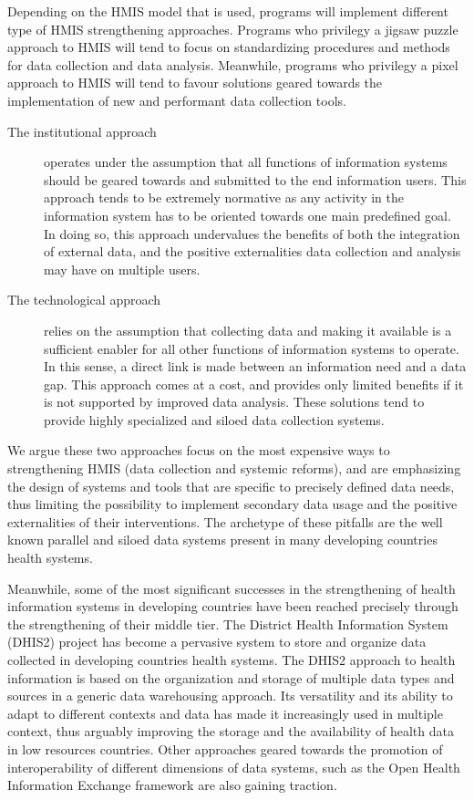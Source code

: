 Depending on the HMIS model that is used, programs will implement different type of HMIS strengthening approaches. Programs who privilegy a jigsaw puzzle approach to HMIS will tend to focus on standardizing procedures and methods for data collection and data analysis. Meanwhile, programs who privilegy a pixel approach to HMIS will tend to favour solutions geared towards the implementation of new and performant data collection tools.

\begin{description}
\item[The institutional approach] operates under the assumption that all functions of information systems should be geared towards and submitted to the end information users. This approach tends to be extremely normative as any activity in the information system has to be oriented towards one main predefined goal. In doing so, this approach undervalues the benefits of both the integration of external data, and the positive externalities data collection and analysis may have on multiple users.

\item[The technological approach] relies on the assumption that collecting data and making it available is a sufficient enabler for all other functions of information systems to operate. In this sense, a direct link is made between an information need and a data gap. This approach comes at a cost, and provides only limited benefits if it is not supported by improved data analysis. These solutions tend to provide highly specialized and siloed data collection systems.
\end{description}

We argue these two approaches focus on the most expensive ways to strengthening HMIS (data collection and systemic reforms), and are emphasizing the design of systems and tools that are specific to precisely defined data needs, thus limiting the possibility to implement secondary data usage and the positive externalities of their interventions. The archetype of these pitfalls are the well known parallel and siloed data systems present in many developing countries health systems.

Meanwhile, some of the most significant successes in the strengthening of health information systems in developing countries have been reached precisely through the strengthening of their middle tier. The District Health Information System (DHIS2) project has become a pervasive system to store and organize data collected in developing countries health systems. The DHIS2 approach to health information is based on the organization and storage of multiple data types and sources in a generic data warehousing approach. Its versatility and its ability to adapt to different contexts and data has made it increasingly used in multiple context, thus arguably improving the storage and the availability of health data in low resources countries. Other approaches geared towards the promotion of interoperability of different dimensions of data systems, such as the Open Health Information Exchange framework are also gaining traction.


